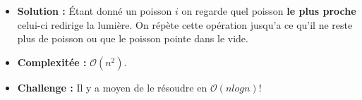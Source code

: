 \begin{frame}
    \frametitle{\problemtitle}
    \begin{itemize}
        \begin{block}{Problème}
            On a $n$ poisson avec des directions, déterminer la taille du banc étant donné un poissoné donné.
        \end{block}
        \item<+-> \textbf{Solution :} Étant donné un poisson $i$ on regarde quel poisson \textbf{le plus proche} celui-ci redirige la lumière. On répète cette opération jusqu'a ce qu'il ne reste plus de poisson ou que le poisson pointe dans le vide. 
        \item<+-> \textbf{Complexitée :} $\mathcal{O}(n^2)$.
        \item<+-> \textbf{Challenge :} Il y a moyen de le résoudre en $\mathcal{O}(n log n) ! $
    \end{itemize}
    \solvestats
\end{frame}
